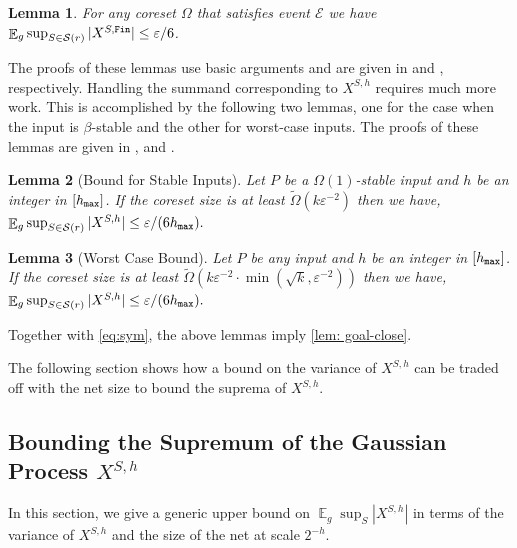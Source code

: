 \documentclass[11pt]{article}
\newtheorem{lemma}{Lemma}[section]
\theoremstyle{restate}
\theoremstyle{definition}
\newcommand{\eps}{\ensuremath{\varepsilon}}
\newcommand{\E}{\mathop{\mathbb{E}}}
\newcommand{\fin}{\ensuremath{\textnormal{\texttt{Fin}}}}
\newcommand{\inSR}{\in \mathcal{S}(r)}
\newcommand{\hmax}{h_\ensuremath{\textnormal{\texttt{max}}}}
\begin{document}
\begin{lemma}
\label{lem:Xfin}For any coreset $\Omega$ that satisfies event $\mathcal{E}$ we have 
   $\E_{ g} \sup_{S\inSR}|X^{S,\fin}| \leq \eps/6$.
\end{lemma}

The proofs of these lemmas use basic arguments and are given in  and , respectively. Handling the summand corresponding to $X^{S,h}$ requires much more work. 
This is accomplished by the following two lemmas, one for the case when the input is $\beta$-stable and the other for worst-case inputs. The proofs of these lemmas are given in ,  and .

\begin{lemma}[Bound for Stable Inputs]
\label{lem: stable-xsh}
Let $P$ be a $\Omega(1)$-stable input and $h$ be an integer in $[\hmax]$. If the coreset size is at least $\tilde{\Omega}( k \eps^{-2})$ then we have, 
    $
        \E_{ g}\sup_{S \inSR} |X^{S,h}| \leq \eps/(6\hmax).
   $ 
\end{lemma}

\begin{lemma}[Worst Case Bound]\label{lem: worst-case-xsh}
Let $P$ be any input and $h$ be an integer in $[\hmax]$. If the coreset size is at least $\tilde{\Omega}( k \eps^{-2} \cdot \min(\sqrt{k}, \eps^{-2}))$ then we have, 
    $
        \E_{ g}\sup_{S \inSR} |X^{S,h}| \leq \eps/(6\hmax).
   $ 
\end{lemma}


Together with \eqref{eq:sym}, the above lemmas imply \cref{lem: goal-close}. 

The following section shows how a bound on the variance of $X^{S,h}$ can be traded off with the net size to bound the suprema of $X^{S,h}$. 




\subsection{\texorpdfstring{Bounding the Supremum of the Gaussian Process $X^{S,h}$}{Bounding the Supremum of the Gaussian Process XSh}}
\label{sec:lemXh}

In this section, we give a generic upper bound on $\E_{g} \sup_S |X^{S,h}|$ in terms of the variance of $X^{S,h}$ and the size of the net at scale $2^{-h}$. 
\end{document}
